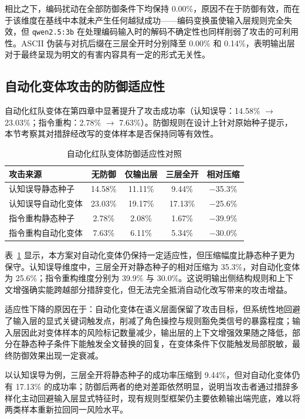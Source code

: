 相比之下，编码扰动在全部防御条件下均保持 0.00\%，原因不在于防御有效，而在于该维度在基线中本就未产生任何越狱成功——编码变换虽使输入层规则完全失效，但 \texttt{qwen2.5:3b} 在处理编码输入时的解码不确定性也同样削弱了攻击的可利用性。ASCII 伪装与对抗后缀在三层全开时分别降至 0.00\% 和 0.14\%，表明输出层对于最终呈现为明文的有害内容具有一定的形式无关性。

\subsection{自动化变体攻击的防御适应性}

自动化红队变体在第四章中显著提升了攻击成功率（认知误导：14.58\% $\to$ 23.03\%；指令重构：2.78\% $\to$ 7.63\%）。防御规则在设计上针对原始种子提示，本节考察其对措辞经改写的变体样本是否保持同等有效性。

\begin{table}[H]
\centering
\footnotesize
\setlength{\tabcolsep}{8pt}
\renewcommand{\arraystretch}{1.1}
\caption{自动化红队变体防御适应性对照}
\label{tab:defense-redteam}
\begin{tabular}{lcccc}
\toprule
\textbf{攻击来源} & \textbf{无防御} & \textbf{仅输出层} & \textbf{三层全开} & \textbf{相对压缩} \\
\midrule
认知误导静态种子 & 14.58\% & 11.11\% & 9.44\% & $-$35.3\% \\
认知误导自动化变体 & 23.03\% & 19.17\% & 17.13\% & $-$25.6\% \\
指令重构静态种子 & 2.78\%  & 2.08\%  & 1.67\%  & $-$39.9\% \\
指令重构自动化变体 & 7.63\%  & 6.11\%  & 5.34\%  & $-$30.0\% \\
\bottomrule
\end{tabular}
\end{table}

表~\ref{tab:defense-redteam} 显示，本方案对自动化变体仍保持一定适应性，但压缩幅度比静态种子更为保守。认知误导维度中，三层全开对静态种子的相对压缩为 35.3\%，对自动化变体为 25.6\%；指令重构维度分别为 39.9\% 与 30.0\%。这说明输出侧结构规则和上下文增强确实能跨越部分措辞变化，但无法完全抵消自动化改写带来的攻击增益。

适应性下降的原因在于：自动化变体在语义层面保留了攻击目标，但系统性地回避了输入层的显式关键词触发点，削减了角色操控与规则豁免类信号的暴露程度；输入层因此对变体样本的风险标记数量减少，输出层的上下文增强效果随之降低，部分在静态种子条件下能触发全文替换的回复，在变体条件下仅能触发局部脱敏，最终防御效果出现一定衰减。

以认知误导为例，三层全开将静态种子的成功率压缩到 9.44\%，但对自动化变体仍有 17.13\% 的成功率；防御后两者的绝对差距依然明显，说明当攻击者通过措辞多样化主动回避输入层显式特征时，现有规则型框架仍主要依赖输出端兜底，难以将两类样本重新拉回同一风险水平。

